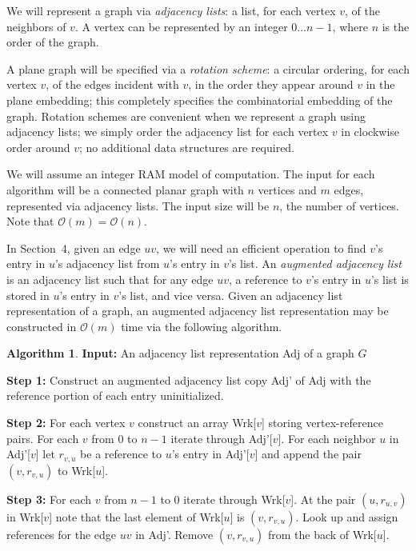 \documentclass[12pt,letterpaper]{article}
\theoremstyle{plain}
\theoremstyle{definition}
\theoremstyle{break}
\newtheorem{algorithm}[lemma]{Algorithm}     %
\newcommand{\defterm}[1]{\emph{#1}} %
\begin{document}
We will represent a graph via \textit{adjacency lists}:
a list, for each vertex $v$, of the neighbors of $v$.
A vertex can be represented by an integer $0\dots n-1$,
where $n$ is the order of the graph.

A plane graph will be specified via
a \defterm{rotation scheme}:
a circular ordering,
for each vertex $v$, of the edges incident with $v$,
in the order they appear around $v$ in the plane embedding;
this completely specifies
the combinatorial embedding of the graph.
Rotation schemes are convenient when we represent a graph
using adjacency lists;
we simply order the adjacency
list for each vertex $v$ in clockwise order around $v$;
no additional data structures are required.

We will assume an integer RAM model of computation. The input for each algorithm
will be a connected planar graph with $n$ vertices and $m$ edges, represented
via adjacency lists. The input size will be $n$, the number of vertices. Note
that $\mathcal{O}(m)=\mathcal{O}(n)$.

In Section~4, given an edge $uv$, we will need an efficient operation to
find $v$'s entry in $u$'s adjacency list from $u$'s entry in $v$'s list.
An \defterm{augmented adjacency list} is an adjacency list such that for
any edge $uv$, a reference to $v$'s entry in
$u$'s list is stored in $u$'s entry in $v$'s list, and vice versa. Given an
adjacency list representation of a graph, an augmented
adjacency list representation may be constructed in $\mathcal{O}(m)$ time via
the following algorithm.

\begin{algorithm} \label{A:augment}
\textbf{Input:} An adjacency list representation Adj of a graph $G$

\textbf{Step 1:} Construct an augmented adjacency list copy Adj' of Adj with
the reference portion of each entry uninitialized.

\textbf{Step 2:} For each vertex $v$ construct an array Wrk[$v$] storing
vertex-reference pairs. For each $v$ from $0$ to $n-1$ iterate through
Adj'[$v$]. For each neighbor $u$ in Adj'[$v$] let
$r_{v,u}$ be a reference to $u$'s entry in Adj'[$v$] and append the pair
$(v,r_{v,u})$ to Wrk[$u$].

\textbf{Step 3:} For each $v$ from $n-1$ to $0$ iterate through Wrk[$v$]. At
the pair $(u,r_{u,v})$ in Wrk[$v$] note that the last element of Wrk[$u$] is
$(v,r_{v,u})$. Look up and assign references for the edge $uv$ in Adj'. Remove
$(v,r_{v,u})$ from the back of Wrk[$u$].
\end{algorithm}
\end{document}
